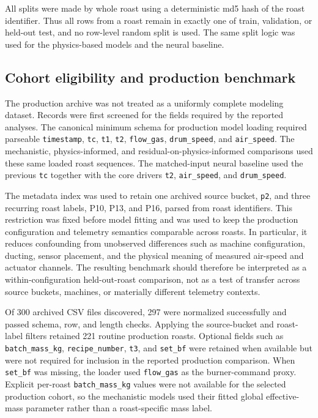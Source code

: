 \documentclass[fleqn,10pt]{wlscirep}
\begin{document}
All splits were made by whole roast using a deterministic md5 hash of the roast identifier. Thus all rows from a roast remain in exactly one of train, validation, or held-out test, and no row-level random split is used. The same split logic was used for the physics-based models and the neural baseline.

\subsection*{Cohort eligibility and production benchmark}

The production archive was not treated as a uniformly complete modeling dataset. Records were first screened for the fields required by the reported analyses. The canonical minimum schema for production model loading required parseable \texttt{timestamp}, \texttt{tc}, \texttt{t1}, \texttt{t2}, \texttt{flow\_gas}, \texttt{drum\_speed}, and \texttt{air\_speed}. The mechanistic, physics-informed, and residual-on-physics-informed comparisons used these same loaded roast sequences. The matched-input neural baseline used the previous \texttt{tc} together with the core drivers \texttt{t2}, \texttt{air\_speed}, and \texttt{drum\_speed}.

The metadata index was used to retain one archived source bucket, \texttt{p2}, and three recurring roast labels, P10, P13, and P16, parsed from roast identifiers. This restriction was fixed before model fitting and was used to keep the production configuration and telemetry semantics comparable across roasts. In particular, it reduces confounding from unobserved differences such as machine configuration, ducting, sensor placement, and the physical meaning of measured air-speed and actuator channels. The resulting benchmark should therefore be interpreted as a within-configuration held-out-roast comparison, not as a test of transfer across source buckets, machines, or materially different telemetry contexts.

Of 300 archived CSV files discovered, 297 were normalized successfully and passed schema, row, and length checks. Applying the source-bucket and roast-label filters retained 221 routine production roasts. Optional fields such as \texttt{batch\_mass\_kg}, \texttt{recipe\_number}, \texttt{t3}, and \texttt{set\_bf} were retained when available but were not required for inclusion in the reported production comparison. When \texttt{set\_bf} was missing, the loader used \texttt{flow\_gas} as the burner-command proxy. Explicit per-roast \texttt{batch\_mass\_kg} values were not available for the selected production cohort, so the mechanistic models used their fitted global effective-mass parameter rather than a roast-specific mass label.
\end{document}
